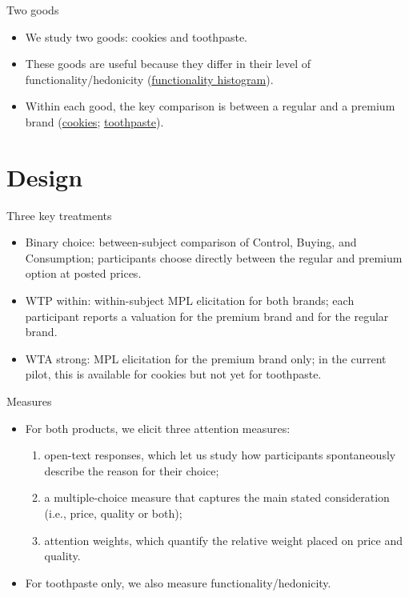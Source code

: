 \documentclass[10pt]{beamer}   %
\newcommand{\ph}[2][0.42\textheight]{%
  \begin{center}%
    \setlength{\fboxsep}{8pt}%
    \fcolorbox{gray!50}{gray!8}{%
      \parbox[c][#1][c]{0.85\linewidth}{\centering\color{gray}\footnotesize FIGURE\\[3pt]#2}}%
  \end{center}}
\newcommand{\src}[1]{\par\smallskip{\footnotesize\color{gray}#1}}
\begin{document}
\begin{frame}{Two goods}
  \hypertarget{main:two_goods}{}
  \begin{itemize}
    \item We study two goods: cookies and toothpaste.
    \item These goods are useful because they differ in their level of functionality/hedonicity (\hyperlink{app:functionality_compare}{functionality histogram}).
    \item Within each good, the key comparison is between a regular and a premium brand
      (\hyperlink{app:cookies_products}{cookies}; \hyperlink{app:toothpaste_products}{toothpaste}).
  \end{itemize}
\end{frame}

\section{Design}

\begin{frame}{Three key treatments}
  \begin{itemize}
    \item Binary choice: between-subject comparison of Control, Buying, and Consumption; participants choose directly between the regular and premium option at posted prices.
    \item WTP within: within-subject MPL elicitation for both brands; each participant reports a valuation for the premium brand and for the regular brand.
    \item WTA strong: MPL elicitation for the premium brand only; in the current pilot, this is available for cookies but not yet for toothpaste.
  \end{itemize}
\end{frame}

\begin{frame}{Measures}
  \begin{itemize}
    \item For both products, we elicit three attention measures:
    \begin{enumerate}

        \item open-text responses, which let us study how participants spontaneously describe the reason for their choice;
        \item a multiple-choice measure that captures the main stated consideration (i.e., price, quality or both);
        \item attention weights, which quantify the relative weight placed on price and quality. \hyperlink{llm_finetune}{}
    \end{enumerate}
    \item For toothpaste only, we also measure functionality/hedonicity.
  \end{itemize}
\end{frame}
\end{document}
